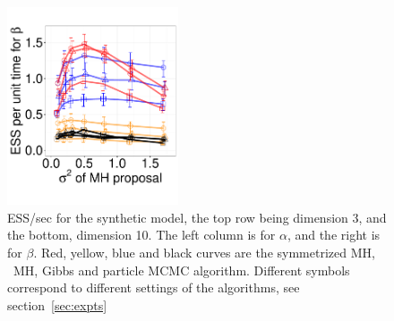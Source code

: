 \begin{figure}[H]
\begin{minipage}[!hp]{0.7\linewidth}
\begin{minipage}[!hp]{0.99\linewidth}
    \includegraphics [width=0.45\textwidth, angle=0]{figs/exp_10_beta.pdf}
  \end{minipage}
  \end{minipage}
  \begin{minipage}[!hp]{0.24\linewidth}
    \caption{ESS/sec for the synthetic  model, the top row being dimension 3, and the bottom,
      dimension 10. The left column is for $\alpha$, and the 
    right is for $\beta$. Red, yellow, blue and black curves are the symmetrized MH,
  \naive\ MH, Gibbs and particle MCMC algorithm. Different symbols correspond
to different settings of the algorithms, see section~\ref{sec:expts}}
     \label{fig:ESS_EXP_D10}
  \end{minipage}
  \vspace{-.3in}
  \end{figure}

